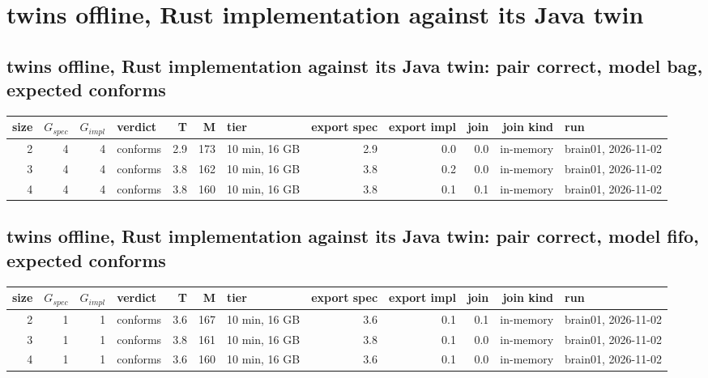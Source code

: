 \documentclass[10pt]{article}
\begin{document}
\section*{twins offline, Rust implementation against its Java twin}
\subsection*{twins offline, Rust implementation against its Java twin: pair \textsf{correct}, model bag, expected conforms}
\begin{longtable}{@{}rrrlrrlrrrrl@{}}
\toprule
size & $G_{\mathit{spec}}$ & $G_{\mathit{impl}}$ & verdict & T & M & tier & export spec & export impl & join & join kind & run \\
\midrule
\endhead
\color{red} 2 & 4 & 4 & conforms & 2.9 & 173 & 10 min, 16 GB & 2.9 & 0.0 & 0.0 & in-memory & brain01, 2026-11-02 \\
\color{red} 3 & 4 & 4 & conforms & 3.8 & 162 & 10 min, 16 GB & 3.8 & 0.2 & 0.0 & in-memory & brain01, 2026-11-02 \\
\color{red} 4 & 4 & 4 & conforms & 3.8 & 160 & 10 min, 16 GB & 3.8 & 0.1 & 0.1 & in-memory & brain01, 2026-11-02 \\
\bottomrule
\end{longtable}
\subsection*{twins offline, Rust implementation against its Java twin: pair \textsf{correct}, model fifo, expected conforms}
\begin{longtable}{@{}rrrlrrlrrrrl@{}}
\toprule
size & $G_{\mathit{spec}}$ & $G_{\mathit{impl}}$ & verdict & T & M & tier & export spec & export impl & join & join kind & run \\
\midrule
\endhead
\color{red} 2 & 1 & 1 & conforms & 3.6 & 167 & 10 min, 16 GB & 3.6 & 0.1 & 0.1 & in-memory & brain01, 2026-11-02 \\
\color{red} 3 & 1 & 1 & conforms & 3.8 & 161 & 10 min, 16 GB & 3.8 & 0.1 & 0.0 & in-memory & brain01, 2026-11-02 \\
\color{red} 4 & 1 & 1 & conforms & 3.6 & 160 & 10 min, 16 GB & 3.6 & 0.1 & 0.0 & in-memory & brain01, 2026-11-02 \\
\bottomrule
\end{longtable}
\end{document}
